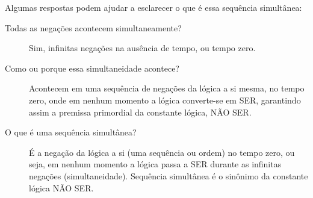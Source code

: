 Algumas respostas podem ajudar a esclarecer o que é essa sequência simultânea:
\begin{description}
   \item[Todas as negações acontecem simultaneamente?] Sim, infinitas negações na ausência de tempo, ou tempo zero.
   \item[Como ou porque essa simultaneidade acontece?] Acontecem em uma sequência de negações da lógica a si mesma, no tempo zero, onde em nenhum momento a lógica converte-se em SER, garantindo assim a premissa primordial da constante lógica, NÃO SER.
   \item[O que é uma sequência simultânea?] É a negação da lógica a si (uma sequência ou ordem) no tempo zero, ou seja, em nenhum momento a lógica passa a SER durante as infinitas negações (simultaneidade). Sequência simultânea é o sinônimo da constante lógica NÃO SER.
\end{description}